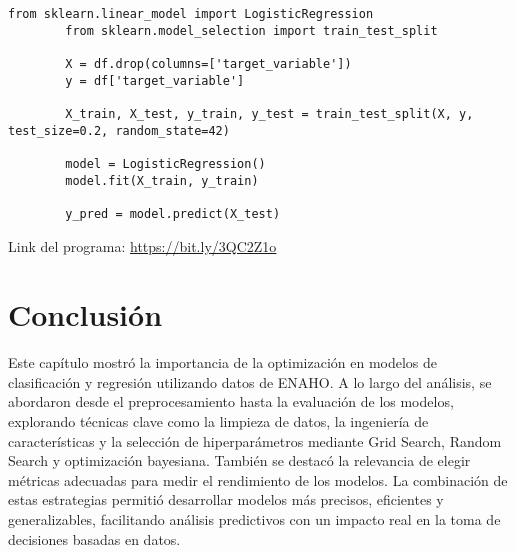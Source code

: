 \documentclass{book}
\begin{document}
	\begin{lstlisting}[caption=Regresi\'on Log\'istica]
		from sklearn.linear_model import LogisticRegression
		from sklearn.model_selection import train_test_split
		
		X = df.drop(columns=['target_variable'])
		y = df['target_variable']
		
		X_train, X_test, y_train, y_test = train_test_split(X, y, test_size=0.2, random_state=42)
		
		model = LogisticRegression()
		model.fit(X_train, y_train)
		
		y_pred = model.predict(X_test)
	\end{lstlisting}
	Link del programa: \href{https://bit.ly/3QC2Z1o}{https://bit.ly/3QC2Z1o}
	\section{Conclusión}
	Este capítulo mostró la importancia de la optimización en modelos de clasificación y regresión utilizando datos de ENAHO. A lo largo del análisis, se abordaron desde el preprocesamiento hasta la evaluación de los modelos, explorando técnicas clave como la limpieza de datos, la ingeniería de características y la selección de hiperparámetros mediante Grid Search, Random Search y optimización bayesiana. También se destacó la relevancia de elegir métricas adecuadas para medir el rendimiento de los modelos. La combinación de estas estrategias permitió desarrollar modelos más precisos, eficientes y generalizables, facilitando análisis predictivos con un impacto real en la toma de decisiones basadas en datos.
\end{document}

